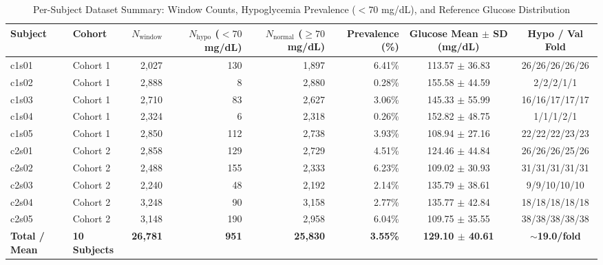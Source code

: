 \begin{table}[htbp]
\centering
\caption{Per-Subject Dataset Summary: Window Counts, Hypoglycemia Prevalence ($<70$ mg/dL), and Reference Glucose Distribution}
\label{tab:dataset_summary}
\begin{tabular}{llrrrrcc}
\toprule
Subject & Cohort & $N_{\text{window}}$ & $N_{\text{hypo}}$ ($<70$ mg/dL) & $N_{\text{normal}}$ ($\ge 70$ mg/dL) & Prevalence (\%) & Glucose Mean $\pm$ SD (mg/dL) & Hypo / Val Fold \\
\midrule
c1s01 & Cohort 1 & 2,027 & 130 & 1,897 & 6.41\% & 113.57 $\pm$ 36.83 & 26/26/26/26/26 \\
c1s02 & Cohort 1 & 2,888 & 8 & 2,880 & 0.28\% & 155.58 $\pm$ 44.59 & 2/2/2/1/1 \\
c1s03 & Cohort 1 & 2,710 & 83 & 2,627 & 3.06\% & 145.33 $\pm$ 55.99 & 16/16/17/17/17 \\
c1s04 & Cohort 1 & 2,324 & 6 & 2,318 & 0.26\% & 152.82 $\pm$ 48.75 & 1/1/1/2/1 \\
c1s05 & Cohort 1 & 2,850 & 112 & 2,738 & 3.93\% & 108.94 $\pm$ 27.16 & 22/22/22/23/23 \\
c2s01 & Cohort 2 & 2,858 & 129 & 2,729 & 4.51\% & 124.46 $\pm$ 44.84 & 26/26/26/25/26 \\
c2s02 & Cohort 2 & 2,488 & 155 & 2,333 & 6.23\% & 109.02 $\pm$ 30.93 & 31/31/31/31/31 \\
c2s03 & Cohort 2 & 2,240 & 48 & 2,192 & 2.14\% & 135.79 $\pm$ 38.61 & 9/9/10/10/10 \\
c2s04 & Cohort 2 & 3,248 & 90 & 3,158 & 2.77\% & 135.77 $\pm$ 42.84 & 18/18/18/18/18 \\
c2s05 & Cohort 2 & 3,148 & 190 & 2,958 & 6.04\% & 109.75 $\pm$ 35.55 & 38/38/38/38/38 \\
\midrule
\textbf{Total / Mean} & \textbf{10 Subjects} & \textbf{26,781} & \textbf{951} & \textbf{25,830} & \textbf{3.55\%} & \textbf{129.10 $\pm$ 40.61} & \textbf{$\sim$19.0/fold} \\
\bottomrule
\end{tabular}
\end{table}
